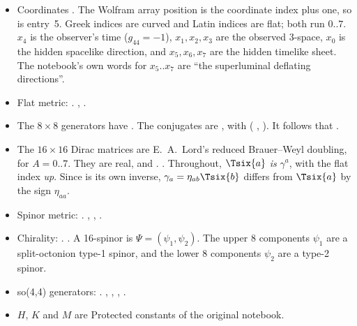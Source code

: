 \begin{itemize}
  \item Coordinates . The Wolfram array position is the coordinate
    index plus one, so  is entry~5. Greek indices are curved and Latin indices are flat;
    both run $0..7$. $x_4$ is the observer's time ($g_{44}=-1$), $x_1,x_2,x_3$ are the observed
    3-space, $x_0$ is the hidden spacelike direction, and $x_5,x_6,x_7$ are the hidden timelike
    sheet. The notebook's own words for $x_5..x_7$ are ``the superluminal deflating directions''.
  \item Flat metric: . 
    , .
  \item The $8\times8$ generators have . The conjugates are
    , with
     ( ,
    ). It follows that .
  \item The $16\times16$ Dirac matrices are E.~A.~Lord's reduced Brauer--Weyl doubling,
     for $A=0..7$. They are real, and
    . 
    . Throughout, $\Tsix{a}$ \emph{is}
    $\gamma^a$, with the flat index \emph{up}. Since  is its own inverse,
    $\gamma_a=\eta_{ab}\Tsix{b}$ differs from $\Tsix{a}$ by the sign $\eta_{aa}$.
  \item Spinor metric: . 
    ,
    ,
    .
  \item Chirality: . 
    .
    A 16-spinor is $\Psi=(\psi_1,\psi_2)$. The upper 8 components $\psi_1$ are a split-octonion
    type-1 spinor, and the lower 8 components $\psi_2$ are a type-2 spinor.
  \item so(4,4) generators: .
     ,
    ,
    ,
    .
  \item $H$, $K$ and $M$ are Protected constants of the original notebook.
\end{itemize}

